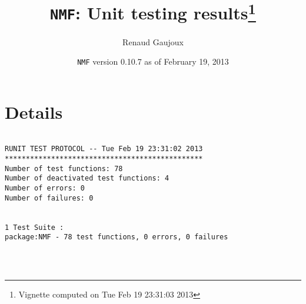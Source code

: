 \documentclass[10pt]{article}
\author{Renaud Gaujoux}
\title{\texttt{NMF}: Unit testing results\footnote{Vignette computed  on Tue Feb 19 23:31:03 2013}}
\date{\texttt{NMF} version 0.10.7 as of February 19, 2013}
\begin{document}
\maketitle

\section{Details}
\begin{verbatim}

RUNIT TEST PROTOCOL -- Tue Feb 19 23:31:02 2013 
*********************************************** 
Number of test functions: 78 
Number of deactivated test functions: 4 
Number of errors: 0 
Number of failures: 0 

 
1 Test Suite : 
package:NMF - 78 test functions, 0 errors, 0 failures




\end{verbatim}
\end{document}
